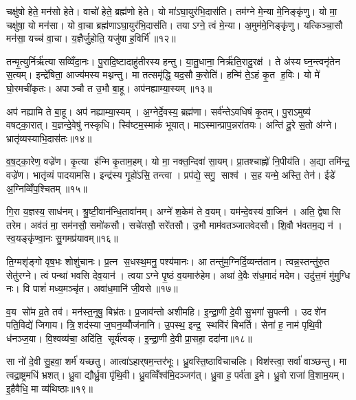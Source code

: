 चक्षु॑षो हेते॒ मन॑सो हेते। वाचो॑ हेते॒ ब्रह्म॑णो हेते। यो मा॑ऽघा॒युर॑भि॒दास॑ति। तम॑ग्ने मे॒न्या मे॒निङ्कृ॑णु। यो मा॒ चक्षु॑षा॒ यो मन॑सा। यो वा॒चा ब्रह्म॑णाऽघा॒युर॑भि॒दास॑ति। तयाऽग्ने॒ त्वं मे॒न्या। अ॒मुम॑मे॒निङ्कृ॑णु। यत्किञ्चा॒सौ मन॑सा॒ यच्च॑ वा॒चा। य॒ज्ञैर्जु॒होति॒ यजु॑षा ह॒विर्भि॑॥१२॥

तन्मृ॒त्युर्निर्\mbox{}ऋ॑त्या सव्विँदा॒नः। पु॒रादि॒ष्टादाहु॑तीरस्य हन्तु। या॒तु॒धाना॒ निर्\mbox{}ऋ॑ति॒रादु॒रक्ष॑। ते अ॑स्य घ्न॒न्त्वनृ॑तेन स॒त्यम्। इन्द्रे॑षिता॒ आज्य॑मस्य मथ्नन्तु। मा तत्समृ॑द्धि॒ यद॒सौ क॒रोति॑। हन्मि॑ ते॒ऽहं कृ॒त ह॒विः। यो मे॑ घो॒रमची॑कृतः। अपाञ्चौ त उ॒भौ बा॒हू। अप॑नह्याम्या॒स्यम्॥१३॥

अप॑ नह्यामि ते बा॒हू। अप॑ नह्याम्या॒स्यम्। अ॒ग्नेर्दे॒वस्य॒ ब्रह्म॑णा। सर्व॑न्तेऽवधिषं कृ॒तम्। पु॒राऽमुष्य॑ वषट्का॒रात्। य॒ज्ञन्दे॒वेषु॑ नस्कृधि। स्वि॑ष्टम॒स्माकं॑ भूयात्। माऽस्मान्प्राप॒न्नरा॑तयः। अन्ति॑ दू॒रे स॒तो अ॑ग्ने। भ्रातृ॑व्यस्याभि॒दास॑तः॥१४॥

व॒ष॒ट्का॒रेण॒ वज्रे॑ण। कृ॒त्या ह॑न्मि कृ॒ताम॒हम्। यो मा॒ नक्त॒न्दिवा॑ सा॒यम्। प्रा॒तश्चाह्नो॑ नि॒पीय॑ति। अ॒द्या तमि॑न्द्र॒ वज्रे॑ण। भातृ॑व्यं पादयामसि। इन्द्र॑स्य गृ॒हो॑ऽसि॒ तन्त्वा। प्रप॑द्ये॒ सगु॒ साश्व॑। स॒ह यन्मे॒ अस्ति॒ तेन॑। ईडे॑ अ॒ग्निव्विँ॑प॒श्चितम्॥१५॥

गि॒रा य॒ज्ञस्य॒ साध॑नम्। श्रु॒ष्टी॒वान॑न्धि॒तावा॑नम्। अग्ने॑ श॒केम॑ ते व॒यम्। यम॑न्दे॒वस्य॑ वा॒जिन॑। अति॒ द्वेषासि तरेम। अव॑तं मा॒ सम॑नसौ॒ समो॑कसौ। सचे॑तसौ॒ सरे॑तसौ। उ॒भौ माम॑वतञ्जातवेदसौ। शि॒वौ भ॑वतम॒द्य न॑। स्व॒यङ्कृ॑ण्वा॒नः सु॒गमप्र॑यावम्॥१६॥

ति॒ग्मशृ॑ङ्गो वृष॒भः शोशु॑चानः। प्र॒त्न स॒धस्थ॒मनु॒ पश्य॑मानः। आ तन्तु॑म॒ग्निर्दि॒व्यन्त॑तान। त्वन्न॒स्तन्तु॑रु॒त सेतु॑रग्ने। त्वं पन्था॑ भवसि देव॒यान॑। त्वयाऽग्ने पृ॒ष्ठं व॒यमारु॑हेम। अथा॑ दे॒वैः स॑ध॒मादं॑ मदेम। उदु॑त्त॒मं मु॑मुग्धि नः। वि पाशं॑ मध्य॒मञ्चृ॑त। अवा॑ध॒मानि॑ जी॒वसे॥१७॥

व॒य सो॑म व्र॒ते तव॑। मन॑स्त॒नूषु॒ बिभ्र॑तः। प्र॒जाव॑न्तो अशीमहि। इ॒न्द्रा॒णी दे॒वी सु॒भगा॑ सु॒पत्नी। उदशे॑न पति॒विद्ये॑ जिगाय। त्रि॒शद॑स्या ज॒घन॒य्योँज॑नानि। उ॒पस्थ॒ इन्द्र॒ स्थवि॑रं बिभर्ति। सेना॑ ह॒ नाम॑ पृथि॒वी ध॑नञ्ज॒या। वि॒श्वव्य॑चा॒ अदि॑ति॒ सूर्य॑त्वक्। इ॒न्द्रा॒णी दे॒वी प्रा॒सहा॒ ददा॑ना॥१८॥

सा नो॑ दे॒वी सु॒हवा॒ शर्म॑ यच्छतु। आत्वा॑ऽहार्‌षम॒न्तर॑भूः। ध्रु॒वस्ति॒ष्ठावि॑चाचलिः। विश॑स्त्वा॒ सर्वा॑ वाञ्छन्तु। मा त्वद्रा॒ष्ट्रमधि॑ भ्रशत्। ध्रु॒वा द्यौर्ध्रु॒वा पृ॑थि॒वी। ध्रु॒वव्विँश्व॑मि॒दञ्जग॑त्। ध्रु॒वा ह॒ पर्व॑ता इ॒मे। ध्रु॒वो राजा॑ वि॒शाम॒यम्। इ॒हैवैधि॒ मा व्य॑थिष्ठाः॥१९॥

